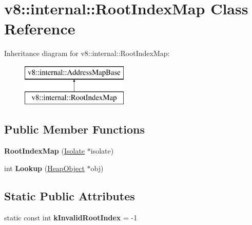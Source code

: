 \hypertarget{classv8_1_1internal_1_1_root_index_map}{}\section{v8\+:\+:internal\+:\+:Root\+Index\+Map Class Reference}
\label{classv8_1_1internal_1_1_root_index_map}
Inheritance diagram for v8\+:\+:internal\+:\+:Root\+Index\+Map\+:\begin{figure}[H]
\begin{center}
\leavevmode
\includegraphics[height=2.000000cm]{classv8_1_1internal_1_1_root_index_map}
\end{center}
\end{figure}
\subsection*{Public Member Functions}
\begin{DoxyCompactItemize}
\item 
{\bfseries Root\+Index\+Map} (\hyperlink{classv8_1_1internal_1_1_isolate}{Isolate} $\ast$isolate)\hypertarget{classv8_1_1internal_1_1_root_index_map_a9536a6e36f64916b6af65519b9a5a34c}{}\label{classv8_1_1internal_1_1_root_index_map_a9536a6e36f64916b6af65519b9a5a34c}

\item 
int {\bfseries Lookup} (\hyperlink{classv8_1_1internal_1_1_heap_object}{Heap\+Object} $\ast$obj)\hypertarget{classv8_1_1internal_1_1_root_index_map_a5d37f5877736681ac5aaef61eb0aa4a6}{}\label{classv8_1_1internal_1_1_root_index_map_a5d37f5877736681ac5aaef61eb0aa4a6}

\end{DoxyCompactItemize}
\subsection*{Static Public Attributes}
\begin{DoxyCompactItemize}
\item 
static const int {\bfseries k\+Invalid\+Root\+Index} = -\/1\hypertarget{classv8_1_1internal_1_1_root_index_map_a0f3fe203b3cf5fbd0d8add808f8954a1}{}\label{classv8_1_1internal_1_1_root_index_map_a0f3fe203b3cf5fbd0d8add808f8954a1}

\end{DoxyCompactItemize}
